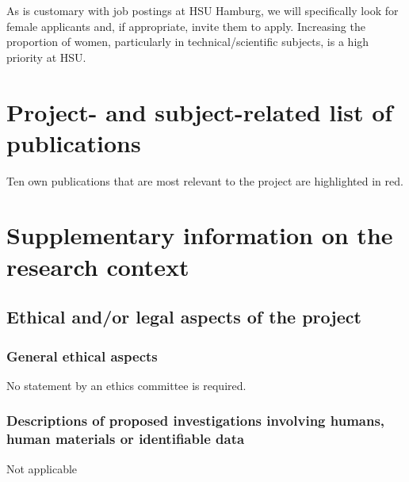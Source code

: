 \documentclass[11pt,a4paper,twoside]{scrartcl}
\begin{document}
As is customary with job postings at HSU Hamburg, we will specifically look for 
female applicants and, if appropriate, invite them to apply. Increasing the 
proportion of women, particularly in technical/scientific subjects, is a high 
priority at HSU.\\




\section{Project- and subject-related list of publications}
Ten own publications that are most relevant to the project are highlighted in 
red. 
\vspace{0.3cm}
\setlength\bibitemsep{2pt}
\renewcommand*{\bibfont}{\normalfont\fontsize{9}{11}\selectfont}
\printbibliography[heading=none]%
\pagebreak


\section{Supplementary information on the research context}
\subsection{Ethical and/or legal aspects of the project}

\subsubsection{General ethical aspects}
\qquad \quad No statement by an ethics committee is required. 

\subsubsection{Descriptions of proposed investigations involving humans, 
human 
materials or identifiable data}
\qquad \quad Not applicable
\end{document}

